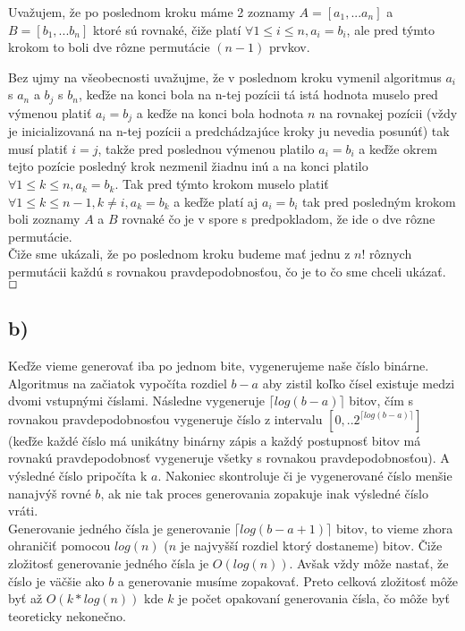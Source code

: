 \documentclass[a4paper]{article}
\begin{document}
Uvažujem, že po poslednom kroku máme 2 zoznamy $A=[a_1,...a_n]$ a $B=[b_1,...b_n]$ ktoré sú rovnaké, čiže platí $\forall 1\leq i \leq n, a_i = b_i$, ale pred týmto krokom to boli dve rôzne permutácie $(n-1)$ prvkov. 

Bez ujmy na všeobecnosti uvažujme, že v poslednom kroku vymenil algoritmus $a_i$ s $a_n$ a $b_j$ s $b_n$, keďže na konci bola na n-tej pozícii tá istá hodnota muselo pred výmenou platiť $a_i = b_j$ a keďže na konci bola hodnota $n$ na rovnakej pozícii (vždy je inicializovaná na n-tej pozícii a predchádzajúce kroky ju nevedia posunúť) tak musí platiť $i=j$, takže pred poslednou výmenou platilo $a_i = b_i$ a keďže okrem tejto pozície posledný krok nezmenil žiadnu inú a na konci platilo  $\forall 1\leq k \leq n, a_k = b_k$. Tak pred týmto krokom muselo platiť  $\forall 1\leq k \leq n-1, k \neq i, a_k = b_k$ a keďže platí aj $a_i = b_i$ tak pred posledným krokom boli zoznamy $A$ a $B$ rovnaké čo je v spore s predpokladom, že ide o dve rôzne permutácie.
\\

Čiže sme ukázali, že po poslednom kroku budeme mať jednu z $n!$ rôznych permutácii každú s rovnakou pravdepodobnosťou, čo je to čo sme chceli ukázať. $\oblong$
\newpage

\subsection*{b)}

Keďže vieme generovať iba po jednom bite, vygenerujeme naše číslo binárne. Algoritmus na začiatok vypočíta rozdiel $b-a$ aby zistil koľko čísel existuje medzi dvomi vstupnými číslami. Následne vygeneruje $\lceil log(b-a) \rceil$ bitov, čím s rovnakou pravdepodobnosťou vygeneruje číslo z intervalu $[0,..2^{\lceil log(b-a) \rceil}]$ (keďže každé číslo má unikátny binárny zápis a každý postupnosť bitov má rovnakú pravdepodobnosť vygeneruje všetky s rovnakou pravdepodobnosťou). A výsledné číslo pripočíta k $a$. Nakoniec skontroluje či je vygenerované číslo menšie nanajvýš rovné $b$, ak nie tak proces generovania zopakuje inak výsledné číslo vráti. 
\\

Generovanie jedného čísla je generovanie $\lceil log(b-a+1) \rceil$ bitov, to vieme zhora ohraničiť pomocou $log(n)$ ($n$ je najvyšší rozdiel ktorý dostaneme) bitov. Čiže zložitosť generovanie jedného čísla je $O(log(n))$. Avšak vždy môže nastať, že číslo je väčšie ako $b$ a generovanie musíme zopakovať. Preto celková zložitosť môže byť až $O(k*log(n))$ kde $k$ je počet opakovaní generovania čísla, čo môže byť teoreticky nekonečno.
\\
\end{document}
